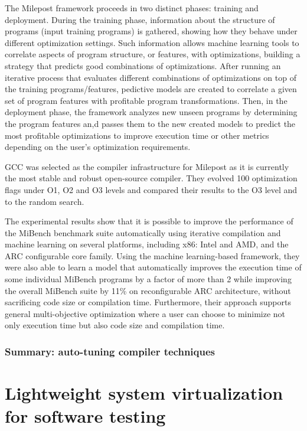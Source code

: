 The Milepost framework proceeds in two distinct phases: training and deployment. During the training phase, information about the structure of programs (input training programs) is gathered, showing how they behave under different optimization settings. Such information allows machine learning tools to correlate aspects of program structure, or features, with optimizations, building a strategy that predicts good combinations of optimizations. 
After running an iterative process that evaluates different combinations of optimizations on top of the training programs/features, pedictive models are created to correlate a given set of program features with profitable program transformations. 
Then, in the deployment phase, the framework analyzes new unseen programs by determining the program features an,d passes them to the new created models to predict the most profitable optimizations to improve execution time or other metrics depending on the user’s optimization requirements.

GCC was selected as the compiler infrastructure for Milepost as it is currently the most stable and robust open-source compiler. They evolved 100 optimization flags under O1, O2 and O3 levels and compared their results to the O3 level and to the random search.

The experimental results show that it is possible to improve the performance of the MiBench benchmark suite automatically using iterative compilation and machine learning on several platforms, including x86: Intel and AMD, and the ARC configurable core family. Using the machine learning-based framework, they were also able to learn a model that automatically improves the execution time of some individual MiBench programs by a factor of more than 2 while improving the overall MiBench suite by 11\% on reconfigurable ARC architecture, without sacrificing code size or compilation time. Furthermore, their approach supports general multi-objective optimization where a user can choose to minimize not only execution time but also code size and compilation time.



\subsubsection{Summary: auto-tuning compiler techniques}
 



\section{Lightweight system virtualization for software testing}
\label{sec:Lightweight system virtualization for software testing}

